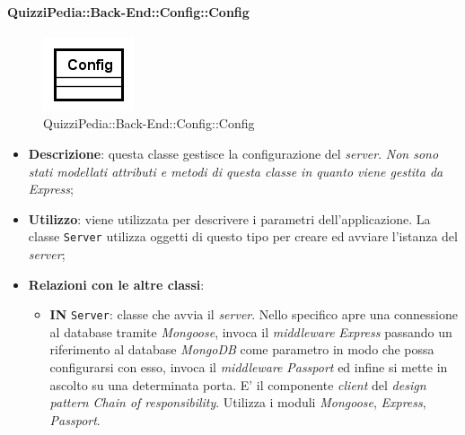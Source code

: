 \paragraph{QuizziPedia::Back-End::Config::Config}
\label{QuizziPedia::Back-End::Config::Config}
\begin{figure}[ht]
	\centering
	\includegraphics[scale=0.8]{UML/Classi/Back-End/QuizziPedia_Back-End_Config_Config.png}
	\caption{QuizziPedia::Back-End::Config::Config}
	\end{figure}
\FloatBarrier
	\begin{itemize}
		\item \textbf{Descrizione}:
		questa classe gestisce la configurazione del \textit{server}. \textit{Non sono stati modellati attributi e metodi di questa classe in quanto viene gestita da Express};
		\item \textbf{Utilizzo}:
		viene utilizzata per descrivere i parametri dell'applicazione. La classe \texttt{Server} utilizza oggetti di questo tipo per creare ed avviare l'istanza del \textit{server};
		\item \textbf{Relazioni con le altre classi}:
		 \begin{itemize}
		 	\item \textbf{IN} \texttt{Server}:
		 	classe che avvia il \textit{server}. Nello specifico apre una connessione al database tramite \textit{Mongoose}, invoca il \textit{middleware} \textit{Express} passando un riferimento al database \textit{MongoDB} come parametro in modo  che possa configurarsi con esso, invoca il \textit{middleware} \textit{Passport} ed infine si mette in ascolto su una determinata porta. E' il componente \textit{client} del \textit{design pattern} \textit{Chain of responsibility}. Utilizza i moduli \textit{Mongoose}, \textit{Express}, \textit{Passport}.
		 \end{itemize}
	\end{itemize}
